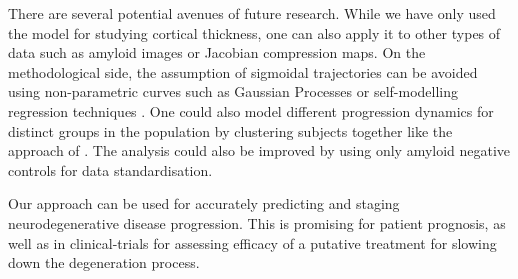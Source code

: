 There are several potential avenues of future research. While we have only used the model for studying cortical thickness, one can also apply it to other types of data such as amyloid images or Jacobian compression maps. On the methodological side, the assumption of sigmoidal trajectories can be avoided using non-parametric curves such as Gaussian Processes or self-modelling regression techniques \cite{donohue2014estimating}. One could also model different progression dynamics for distinct groups in the population by clustering subjects together like the approach of \cite{young2015multiple}. The analysis could also be improved by using only amyloid negative controls for data standardisation.

Our approach can be used for accurately predicting and staging neurodegenerative disease progression. This is promising for patient prognosis, as well as in clinical-trials for assessing efficacy of a putative treatment for slowing down the degeneration process.